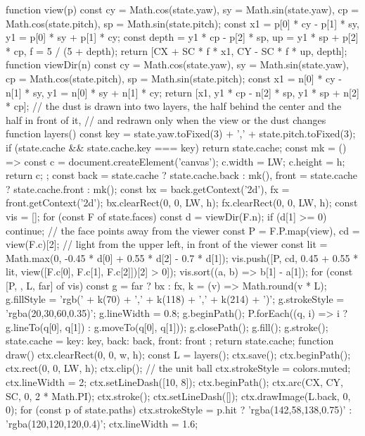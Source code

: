 \begin{js}
function view(p) {
  const cy = Math.cos(state.yaw), sy = Math.sin(state.yaw), cp = Math.cos(state.pitch), sp = Math.sin(state.pitch);
  const x1 = p[0] * cy - p[1] * sy, y1 = p[0] * sy + p[1] * cy;
  const depth = y1 * cp - p[2] * sp, up = y1 * sp + p[2] * cp, f = 5 / (5 + depth);
  return [CX + SC * f * x1, CY - SC * f * up, depth];
}
function viewDir(n) {
  const cy = Math.cos(state.yaw), sy = Math.sin(state.yaw), cp = Math.cos(state.pitch), sp = Math.sin(state.pitch);
  const x1 = n[0] * cy - n[1] * sy, y1 = n[0] * sy + n[1] * cy;
  return [x1, y1 * cp - n[2] * sp, y1 * sp + n[2] * cp];
}
// the dust is drawn into two layers, the half behind the center and the half in front of it,
// and redrawn only when the view or the dust changes
function layers() {
  const key = state.yaw.toFixed(3) + ',' + state.pitch.toFixed(3);
  if (state.cache && state.cache.key === key) return state.cache;
  const mk = () => { const c = document.createElement('canvas'); c.width = LW; c.height = h; return c; };
  const back = state.cache ? state.cache.back : mk(), front = state.cache ? state.cache.front : mk();
  const bx = back.getContext('2d'), fx = front.getContext('2d');
  bx.clearRect(0, 0, LW, h); fx.clearRect(0, 0, LW, h);
  const vis = [];
  for (const F of state.faces) {
    const d = viewDir(F.n); if (d[1] >= 0) continue;           // the face points away from the viewer
    const P = F.P.map(view), cd = view(F.c)[2];
    // light from the upper left, in front of the viewer
    const lit = Math.max(0, -0.45 * d[0] + 0.55 * d[2] - 0.7 * d[1]);
    vis.push([P, cd, 0.45 + 0.55 * lit, view([F.c[0], F.c[1], F.c[2]])[2] > 0]);
  }
  vis.sort((a, b) => b[1] - a[1]);
  for (const [P, , L, far] of vis) {
    const g = far ? bx : fx, k = (v) => Math.round(v * L);
    g.fillStyle = 'rgb(' + k(70) + ',' + k(118) + ',' + k(214) + ')'; g.strokeStyle = 'rgba(20,30,60,0.35)'; g.lineWidth = 0.8;
    g.beginPath(); P.forEach((q, i) => i ? g.lineTo(q[0], q[1]) : g.moveTo(q[0], q[1])); g.closePath(); g.fill(); g.stroke();
  }
  state.cache = { key: key, back: back, front: front };
  return state.cache;
}
function draw() {
  ctx.clearRect(0, 0, w, h);
  const L = layers();
  ctx.save(); ctx.beginPath(); ctx.rect(0, 0, LW, h); ctx.clip();
  // the unit ball
  ctx.strokeStyle = colors.muted; ctx.lineWidth = 2; ctx.setLineDash([10, 8]);
  ctx.beginPath(); ctx.arc(CX, CY, SC, 0, 2 * Math.PI); ctx.stroke(); ctx.setLineDash([]);
  ctx.drawImage(L.back, 0, 0);
  for (const p of state.paths) {
    ctx.strokeStyle = p.hit ? 'rgba(142,58,138,0.75)' : 'rgba(120,120,120,0.4)'; ctx.lineWidth = 1.6;
}}
\end{js}
